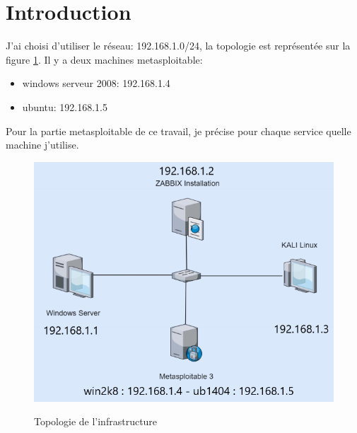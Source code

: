 \documentclass[a4paper]{article}
\begin{document}
\let\cleardoublepage\clearpage















\section{Introduction}





J'ai choisi d'utiliser le réseau: 192.168.1.0/24, la topologie est représentée sur la figure \ref{fig:topologie}. Il y a deux machines metasploitable:
\begin{itemize}
    \item windows serveur 2008: 192.168.1.4
    \item ubuntu: 192.168.1.5
\end{itemize}
Pour la partie metasploitable de ce travail, je précise pour chaque service quelle machine j'utilise.

\begin{figure}[H]
    \centering
    \includegraphics[width=0.80\linewidth]{images/topologie-01.png}
    \label{fig:topologie}
    \caption{Topologie de l'infrastructure}
\end{figure}





\end{document}

